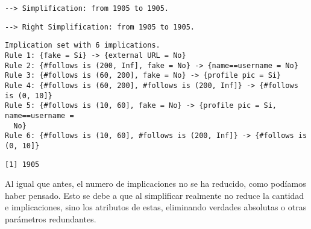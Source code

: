 \documentclass[
  letterpaper,
  DIV=11,
  numbers=noendperiod]{scrreprt}
\newenvironment{Shaded}{\begin{snugshade}}{\end{snugshade}}
\newcommand{\FunctionTok}[1]{\textcolor[rgb]{0.28,0.35,0.67}{#1}}
\newcommand{\NormalTok}[1]{\textcolor[rgb]{0.00,0.23,0.31}{#1}}
\newcommand{\SpecialCharTok}[1]{\textcolor[rgb]{0.37,0.37,0.37}{#1}}
\begin{document}
\begin{verbatim}
--> Simplification: from 1905 to 1905.
\end{verbatim}

\begin{verbatim}
--> Right Simplification: from 1905 to 1905.
\end{verbatim}

\begin{Shaded}
\end{Shaded}

\begin{verbatim}
Implication set with 6 implications.
Rule 1: {fake = Si} -> {external URL = No}
Rule 2: {#follows is (200, Inf], fake = No} -> {name==username = No}
Rule 3: {#follows is (60, 200], fake = No} -> {profile pic = Si}
Rule 4: {#follows is (60, 200], #follows is (200, Inf]} -> {#follows is (0, 10]}
Rule 5: {#follows is (10, 60], fake = No} -> {profile pic = Si, name==username =
  No}
Rule 6: {#follows is (10, 60], #follows is (200, Inf]} -> {#follows is (0, 10]}
\end{verbatim}

\begin{Shaded}
\end{Shaded}

\begin{verbatim}
[1] 1905
\end{verbatim}

Al igual que antes, el numero de implicaciones no se ha reducido, como
podíamos haber pensado. Esto se debe a que al simplificar realmente no
reduce la cantidad e implicaciones, sino los atributos de estas,
eliminando verdades absolutas o otras parámetros redundantes.

\begin{Shaded}
\end{Shaded}
\end{document}
